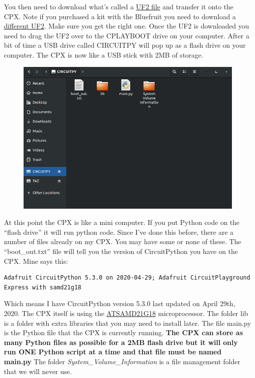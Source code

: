 You then need to download what’s called a \href{https://circuitpython.org/board/circuitplayground_express/}{UF2 file} and transfer it
onto the CPX. Note if you purchased a kit with the Bluefruit you need
to download a
\href{https://circuitpython.org/board/circuitplayground_bluefruit/}{different
  UF2}. Make sure you get the right one. Once the 
UF2 is downloaded you need to drag the UF2 over to the CPLAYBOOT drive
on your computer. After a bit of time a USB drive called CIRCUITPY
will pop up as a flash drive on your computer. The CPX is now like a
USB stick with 2MB of storage. 
\begin{figure}[H]
  \begin{center}
    \includegraphics[width=\textwidth]{Figures/CIRCUITPY.png}
  \end{center}
\end{figure}
At this point the CPX is like a mini computer. If you put Python code
on the “flash drive” it will run python code. Since I’ve done this
before, there are a number of files already on my CPX. You may have
some or none of these. The “boot\_out.txt” file will tell you the
version of CircuitPython you have on the CPX. Mine says this:
\begin{verbatim}
Adafruit CircuitPython 5.3.0 on 2020-04-29; Adafruit CircuitPlayground Express with samd21g18
\end{verbatim}
Which means I have CircuitPython version 5.3.0 last updated on April
29th, 2020. The CPX itself is using the \href{https://www.microchip.com/wwwproducts/en/ATsamd21g18}{ATSAMD21G18}
microprocessor. The folder lib is a folder with extra libraries that
you may need to install later. The file main.py is the Python file
that the CPX is currently running. {\bf The CPX can store as many Python
files as possible for a 2MB flash drive but it will only run ONE
Python script at a time and that file must be named main.py} The folder
{\it System\_Volume\_Information} is a file management folder that we will
never use.

